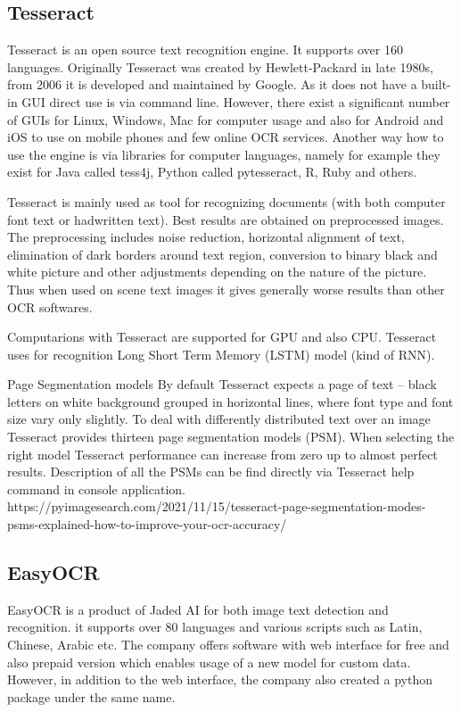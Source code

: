 \subsection{Tesseract}

Tesseract is an open source text recognition engine. It supports over 160 languages. Originally Tesseract was created by Hewlett-Packard in late 1980s, from 2006 it is developed and maintained by Google. As it does not have a built-in GUI direct use is via command line. However, there exist a significant number of GUIs for Linux, Windows, Mac for computer usage and also for Android and iOS to use on mobile phones and few online OCR services. Another way how to use the engine is via libraries for computer languages, namely for example they exist for Java called tess4j, Python called pytesseract, R, Ruby and others. \cite{tesseract1}

Tesseract is mainly used as tool for recognizing documents (with both computer font text or hadwritten text). Best results are obtained on preprocessed images. The preprocessing includes noise reduction, horizontal alignment of text, elimination of dark borders around text region, conversion to binary black and white picture and other adjustments depending on the nature of the picture. Thus when used on scene text images it gives generally worse results than other OCR softwares. 

Computarions with Tesseract are supported for GPU and also CPU. Tesseract uses for recognition Long Short Term Memory (LSTM) model (kind of RNN).

Page Segmentation models
By default Tesseract expects a page of text -- black letters on white background grouped in horizontal lines, where font type and font size vary only slightly. To deal with differently distributed text over an image Tesseract provides thirteen page segmentation models (PSM). When selecting the right model Tesseract performance can increase from zero up to almost perfect results. Description of all the PSMs can be find directly via Tesseract help command in console application. 
https://pyimagesearch.com/2021/11/15/tesseract-page-segmentation-modes-psms-explained-how-to-improve-your-ocr-accuracy/

\subsection{EasyOCR}

EasyOCR is a product of Jaded AI for both image text detection and recognition. it supports over 80 languages and various scripts such as Latin, Chinese, Arabic etc. The company offers software with web interface for free and also prepaid version which enables usage of a new model for custom data. However, in addition to the web interface, the company also created a python package under the same name.\cite{easyocr1}

